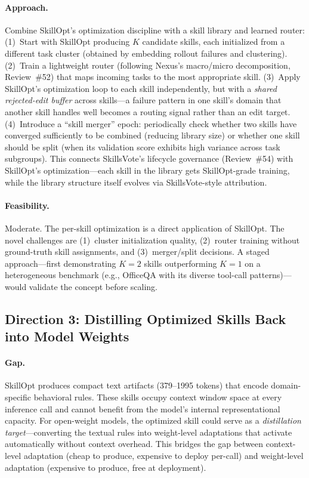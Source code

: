 \documentclass[11pt,a4paper]{article}
\begin{document}
\paragraph{Approach.}
Combine SkillOpt's optimization discipline with a skill library and learned router: (1)~Start with SkillOpt producing $K$ candidate skills, each initialized from a different task cluster (obtained by embedding rollout failures and clustering). (2)~Train a lightweight router (following Nexus's macro/micro decomposition, Review~\#52) that maps incoming tasks to the most appropriate skill. (3)~Apply SkillOpt's optimization loop to each skill independently, but with a \emph{shared rejected-edit buffer} across skills---a failure pattern in one skill's domain that another skill handles well becomes a routing signal rather than an edit target. (4)~Introduce a ``skill merger'' epoch: periodically check whether two skills have converged sufficiently to be combined (reducing library size) or whether one skill should be split (when its validation score exhibits high variance across task subgroups). This connects SkillsVote's lifecycle governance (Review~\#54) with SkillOpt's optimization---each skill in the library gets SkillOpt-grade training, while the library structure itself evolves via SkillsVote-style attribution.

\paragraph{Feasibility.}
Moderate. The per-skill optimization is a direct application of SkillOpt. The novel challenges are (1)~cluster initialization quality, (2)~router training without ground-truth skill assignments, and (3)~merger/split decisions. A staged approach---first demonstrating $K=2$ skills outperforming $K=1$ on a heterogeneous benchmark (e.g., OfficeQA with its diverse tool-call patterns)---would validate the concept before scaling.

\subsection*{Direction 3: Distilling Optimized Skills Back into Model Weights}

\paragraph{Gap.}
SkillOpt produces compact text artifacts (379--1995 tokens) that encode domain-specific behavioral rules. These skills occupy context window space at every inference call and cannot benefit from the model's internal representational capacity. For open-weight models, the optimized skill could serve as a \emph{distillation target}---converting the textual rules into weight-level adaptations that activate automatically without context overhead. This bridges the gap between context-level adaptation (cheap to produce, expensive to deploy per-call) and weight-level adaptation (expensive to produce, free at deployment).
\end{document}
